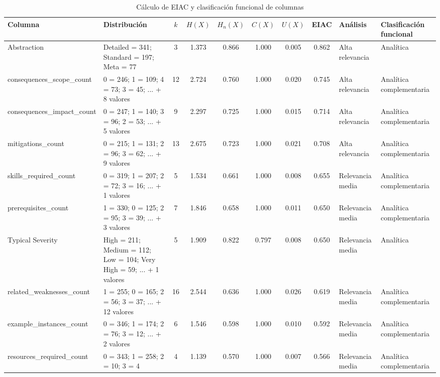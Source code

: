 \begin{table}[h]
\centering
\caption{Cálculo de EIAC y clasificación funcional de columnas}
\label{tab:calculo-eiac-columnas-20260624_095401}
\scriptsize
\begin{tabular}{|p{2.1cm}|p{3.0cm}|c|c|c|c|c|c|p{2.5cm}|p{2.8cm}|}
\hline
\textbf{Columna} & \textbf{Distribución} & \textbf{\(k\)} & \textbf{\(H(X)\)} & \textbf{\(H_n(X)\)} & \textbf{\(C(X)\)} & \textbf{\(U(X)\)} & \textbf{EIAC} & \textbf{Análisis} & \textbf{Clasificación funcional} \\
\hline
Abstraction & Detailed = 341; Standard = 197; Meta = 77 & 3 & 1.373 & 0.866 & 1.000 & 0.005 & 0.862 & Alta relevancia & Analítica \\
\hline
consequences\_scope\_count & 0 = 246; 1 = 109; 4 = 73; 3 = 45; ... + 8 valores & 12 & 2.724 & 0.760 & 1.000 & 0.020 & 0.745 & Alta relevancia & Analítica complementaria \\
\hline
consequences\_impact\_count & 0 = 247; 1 = 140; 3 = 96; 2 = 53; ... + 5 valores & 9 & 2.297 & 0.725 & 1.000 & 0.015 & 0.714 & Alta relevancia & Analítica complementaria \\
\hline
mitigations\_count & 0 = 215; 1 = 131; 2 = 96; 3 = 62; ... + 9 valores & 13 & 2.675 & 0.723 & 1.000 & 0.021 & 0.708 & Alta relevancia & Analítica complementaria \\
\hline
skills\_required\_count & 0 = 319; 1 = 207; 2 = 72; 3 = 16; ... + 1 valores & 5 & 1.534 & 0.661 & 1.000 & 0.008 & 0.655 & Relevancia media & Analítica complementaria \\
\hline
prerequisites\_count & 1 = 330; 0 = 125; 2 = 95; 3 = 39; ... + 3 valores & 7 & 1.846 & 0.658 & 1.000 & 0.011 & 0.650 & Relevancia media & Analítica complementaria \\
\hline
Typical Severity & High = 211; Medium = 112; Low = 104; Very High = 59; ... + 1 valores & 5 & 1.909 & 0.822 & 0.797 & 0.008 & 0.650 & Relevancia media & Analítica \\
\hline
related\_weaknesses\_count & 1 = 255; 0 = 165; 2 = 56; 3 = 37; ... + 12 valores & 16 & 2.544 & 0.636 & 1.000 & 0.026 & 0.619 & Relevancia media & Analítica complementaria \\
\hline
example\_instances\_count & 0 = 346; 1 = 174; 2 = 76; 3 = 12; ... + 2 valores & 6 & 1.546 & 0.598 & 1.000 & 0.010 & 0.592 & Relevancia media & Analítica complementaria \\
\hline
resources\_required\_count & 0 = 343; 1 = 258; 2 = 10; 3 = 4 & 4 & 1.139 & 0.570 & 1.000 & 0.007 & 0.566 & Relevancia media & Analítica complementaria \\

\end{tabular}
\end{table}
